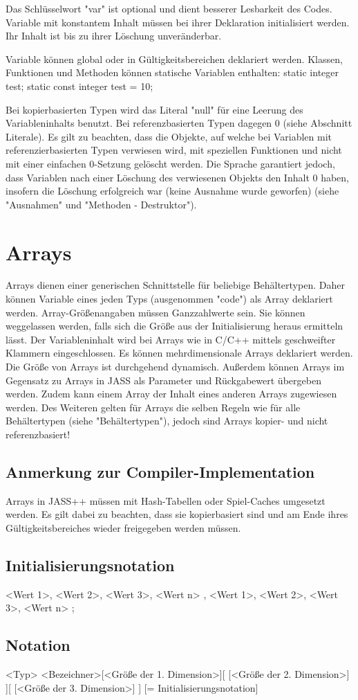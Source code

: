 Das Schlüsselwort "var" ist optional und dient besserer Lesbarkeit des Codes.
Variable mit konstantem Inhalt müssen bei ihrer Deklaration initialisiert werden. Ihr Inhalt ist bis zu ihrer Löschung unveränderbar.

Variable können global oder in Gültigkeitsbereichen deklariert werden.
Klassen, Funktionen und Methoden können statische Variablen enthalten:
static integer test;
static const integer test = 10;

Bei kopierbasierten Typen wird das Literal "null" für eine Leerung des Variableninhalts benutzt. Bei referenzbasierten Typen
dagegen 0 (siehe Abschnitt Literale).
Es gilt zu beachten, dass die Objekte, auf welche bei Variablen mit referenzierbasierten Typen verwiesen wird, mit speziellen Funktionen
und nicht mit einer einfachen 0-Setzung gelöscht werden.
Die Sprache garantiert jedoch, dass Variablen nach einer Löschung des verwiesenen Objekts den Inhalt 0 haben, insofern die Löschung
erfolgreich war (keine Ausnahme wurde geworfen) (siehe "Ausnahmen" und "Methoden - Destruktor").

\section{Arrays}
Arrays dienen einer generischen Schnittstelle für beliebige Behältertypen. Daher können Variable eines jeden Typs (ausgenommen "code")
als Array deklariert werden.
Array-Größenangaben müssen Ganzzahlwerte sein. Sie können weggelassen werden, falls sich die Größe aus der Initialisierung heraus
ermitteln lässt.
Der Variableninhalt wird bei Arrays wie in C/C++ mittels geschweifter Klammern eingeschlossen. Es können mehrdimensionale
Arrays deklariert werden. Die Größe von Arrays ist durchgehend dynamisch. Außerdem können Arrays im Gegensatz zu Arrays in JASS
als Parameter und Rückgabewert übergeben werden. Zudem kann einem Array der Inhalt eines anderen Arrays zugewiesen werden.
Des Weiteren gelten für Arrays die selben Regeln wie für alle Behältertypen (siehe "Behältertypen"), jedoch sind Arrays kopier-
und nicht referenzbasiert!

\subsection{Anmerkung zur Compiler-Implementation}
Arrays in JASS++ müssen mit Hash-Tabellen oder Spiel-Caches umgesetzt werden. Es gilt dabei zu beachten, dass sie kopierbasiert sind
und am Ende ihres Gültigkeitsbereiches wieder freigegeben werden müssen.

\subsection{Initialisierungsnotation}
{ { <Wert 1>, <Wert 2>, <Wert 3>, <Wert n> }, { <Wert 1>, <Wert 2>, <Wert 3>, <Wert n> } };

\subsection{Notation}
<Typ> <Bezeichner>[<Größe der 1. Dimension>][ [<Größe der 2. Dimension>] ][ [<Größe der 3. Dimension>] ] [= Initialisierungsnotation]



